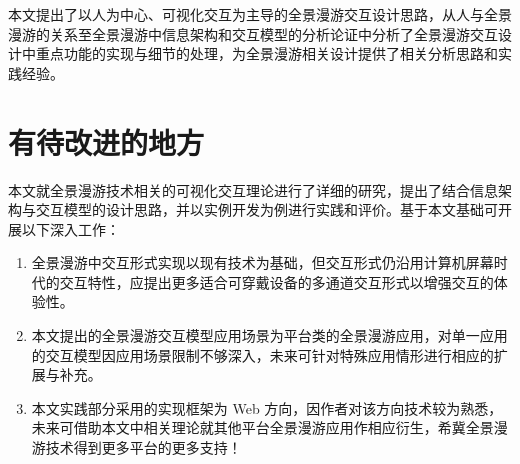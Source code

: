 本文提出了以人为中心、可视化交互为主导的全景漫游交互设计思路，从人与全景漫游的关系至全景漫游中信息架构和交互模型的分析论证中分析了全景漫游交互设计中重点功能的实现与细节的处理，为全景漫游相关设计提供了相关分析思路和实践经验。

\section{有待改进的地方}
本文就全景漫游技术相关的可视化交互理论进行了详细的研究，提出了结合信息架构与交互模型的设计思路，并以实例开发为例进行实践和评价。基于本文基础可开展以下深入工作：
\begin{enumerate}
	\item 全景漫游中交互形式实现以现有技术为基础，但交互形式仍沿用计算机屏幕时代的交互特性，应提出更多适合可穿戴设备的多通道交互形式以增强交互的体验性。
	\item 本文提出的全景漫游交互模型应用场景为平台类的全景漫游应用，对单一应用的交互模型因应用场景限制不够深入，未来可针对特殊应用情形进行相应的扩展与补充。
    \item 本文实践部分采用的实现框架为 Web 方向，因作者对该方向技术较为熟悉，未来可借助本文中相关理论就其他平台全景漫游应用作相应衍生，希冀全景漫游技术得到更多平台的更多支持！
\end{enumerate}